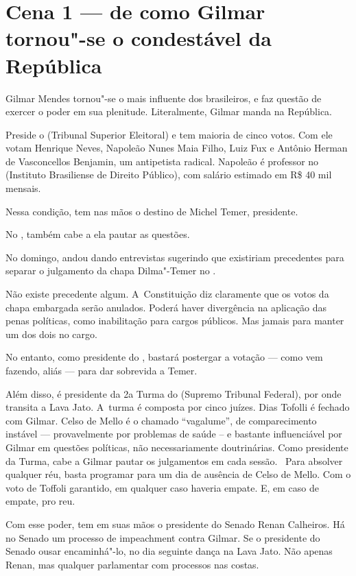  

\section{Cena 1 --- de como Gilmar tornou"-se o condestável da República}

Gilmar Mendes tornou"-se o mais influente dos brasileiros, e faz questão
de exercer o poder em sua plenitude. Literalmente, Gilmar manda na
República.

Preside o  (Tribunal Superior Eleitoral) e tem maioria de cinco
votos. Com ele votam Henrique Neves, Napoleão Nunes Maia Filho, Luiz Fux
e Antônio Herman de Vasconcellos Benjamin, um antipetista radical.
Napoleão é professor no  (Instituto Brasiliense de Direito Público),
com salário estimado em R\$ 40 mil mensais.

Nessa condição, tem nas mãos o destino de Michel Temer, presidente.

No , também cabe a ela pautar as questões.

No domingo, andou dando entrevistas sugerindo que existiriam precedentes
para separar o julgamento da chapa Dilma"-Temer no .

Não existe precedente algum. A~Constituição diz claramente que os votos
da chapa embargada serão anulados. Poderá haver divergência na aplicação
das penas políticas, como inabilitação para cargos públicos. Mas jamais
para manter um dos dois no cargo.

No entanto, como presidente do , bastará postergar a votação --- como
vem fazendo, aliás --- para dar sobrevida a Temer.

Além disso, é presidente da 2a Turma do  (Supremo Tribunal Federal),
por onde transita a Lava Jato. A~turma é composta por cinco juízes. Dias
Tofolli é fechado com Gilmar. Celso de Mello é o chamado ``vagalume'',
de comparecimento instável --- provavelmente por problemas de saúde -- e
bastante influenciável por Gilmar em questões políticas, não
necessariamente doutrinárias. Como presidente da Turma, cabe a Gilmar
pautar os julgamentos em cada sessão.~ Para absolver qualquer réu, basta
programar para um dia de ausência de Celso de Mello. Com o voto de
Toffoli garantido, em qualquer caso haveria empate. E, em caso de
empate, pro reu.

Com esse poder, tem em suas mãos o presidente do Senado Renan Calheiros.
Há no Senado um processo de impeachment contra Gilmar. Se o presidente
do Senado ousar encaminhá"-lo, no dia seguinte dança na Lava Jato. Não
apenas Renan, mas qualquer parlamentar com processos nas costas.

